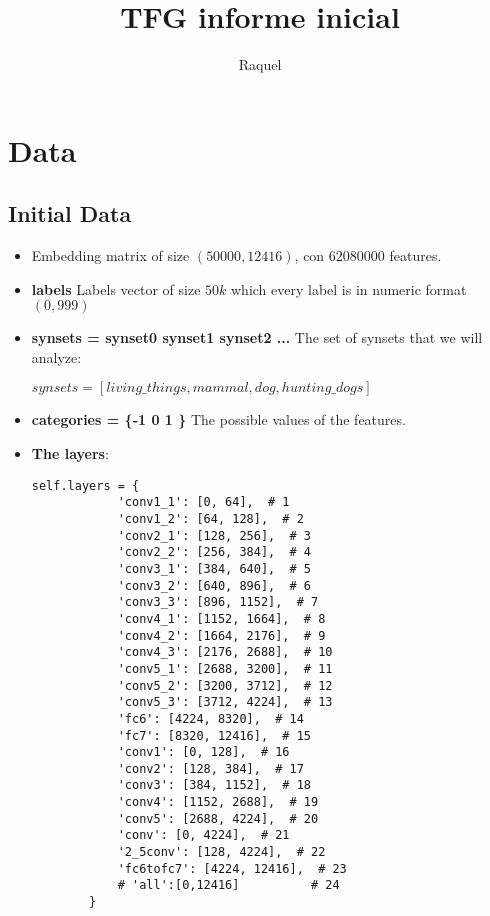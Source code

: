 \documentclass{article}
\title{TFG informe inicial}
\author{Raquel}
\begin{document}
\maketitle

\tableofcontents

\section{Data}
\subsection{Initial Data}
\begin{itemize}
\item Embedding matrix of size $(50000, 12416)$, con $62080000$ features.
\item \textbf{labels} Labels vector of size $50k$ which every label is in numeric format $(0,999)$
\item \textbf{synsets = synset0 synset1 synset2 ...} The set of synsets that we will analyze: 

$ synsets = [living\_things, mammal, dog, hunting\_dogs]$

\item \textbf{categories = \{-1 0 1 \}} The possible values of the features.
\item \textbf{The layers}:
\begin{verbatim}
self.layers = {
            'conv1_1': [0, 64],  # 1
            'conv1_2': [64, 128],  # 2
            'conv2_1': [128, 256],  # 3
            'conv2_2': [256, 384],  # 4
            'conv3_1': [384, 640],  # 5
            'conv3_2': [640, 896],  # 6
            'conv3_3': [896, 1152],  # 7
            'conv4_1': [1152, 1664],  # 8
            'conv4_2': [1664, 2176],  # 9
            'conv4_3': [2176, 2688],  # 10
            'conv5_1': [2688, 3200],  # 11
            'conv5_2': [3200, 3712],  # 12
            'conv5_3': [3712, 4224],  # 13
            'fc6': [4224, 8320],  # 14
            'fc7': [8320, 12416],  # 15
            'conv1': [0, 128],  # 16
            'conv2': [128, 384],  # 17
            'conv3': [384, 1152],  # 18
            'conv4': [1152, 2688],  # 19
            'conv5': [2688, 4224],  # 20
            'conv': [0, 4224],  # 21
            '2_5conv': [128, 4224],  # 22
            'fc6tofc7': [4224, 12416],  # 23
            # 'all':[0,12416]          # 24
        }
\end{verbatim}
\end{itemize}
\end{document}
